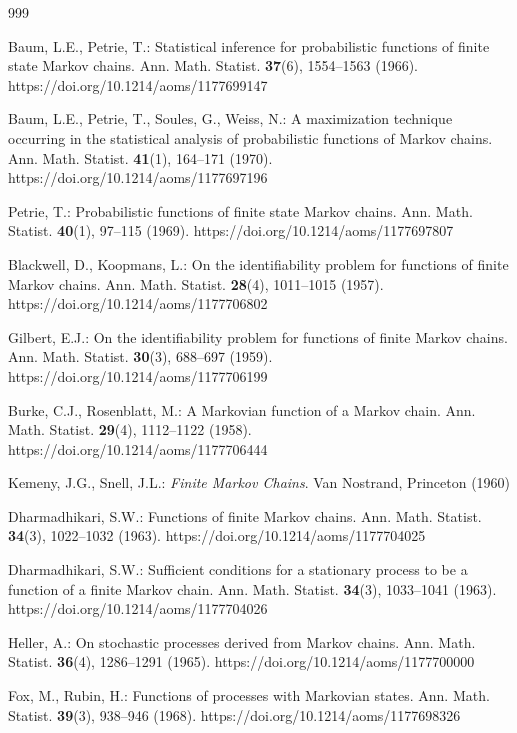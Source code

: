 
\begin{thebibliography}{999}


Baum, L.E., Petrie, T.: Statistical inference for probabilistic functions of finite state Markov chains. Ann. Math. Statist. \textbf{37}(6), 1554--1563 (1966). https://doi.org/10.1214/aoms/1177699147

Baum, L.E., Petrie, T., Soules, G., Weiss, N.: A maximization technique occurring in the statistical analysis of probabilistic functions of Markov chains. Ann. Math. Statist. \textbf{41}(1), 164--171 (1970). https://doi.org/10.1214/aoms/1177697196

Petrie, T.: Probabilistic functions of finite state Markov chains. Ann. Math. Statist. \textbf{40}(1), 97--115 (1969). https://doi.org/10.1214/aoms/1177697807

Blackwell, D., Koopmans, L.: On the identifiability problem for functions of finite Markov chains. Ann. Math. Statist. \textbf{28}(4), 1011--1015 (1957). https://doi.org/10.1214/aoms/1177706802

Gilbert, E.J.: On the identifiability problem for functions of finite Markov chains. Ann. Math. Statist. \textbf{30}(3), 688--697 (1959). https://doi.org/10.1214/aoms/1177706199

Burke, C.J., Rosenblatt, M.: A Markovian function of a Markov chain. Ann. Math. Statist. \textbf{29}(4), 1112--1122 (1958). https://doi.org/10.1214/aoms/1177706444

Kemeny, J.G., Snell, J.L.: \emph{Finite Markov Chains}. Van Nostrand, Princeton (1960)

Dharmadhikari, S.W.: Functions of finite Markov chains. Ann. Math. Statist. \textbf{34}(3), 1022--1032 (1963). https://doi.org/10.1214/aoms/1177704025

Dharmadhikari, S.W.: Sufficient conditions for a stationary process to be a function of a finite Markov chain. Ann. Math. Statist. \textbf{34}(3), 1033--1041 (1963). https://doi.org/10.1214/aoms/1177704026

Heller, A.: On stochastic processes derived from Markov chains. Ann. Math. Statist. \textbf{36}(4), 1286--1291 (1965). https://doi.org/10.1214/aoms/1177700000

Fox, M., Rubin, H.: Functions of processes with Markovian states. Ann. Math. Statist. \textbf{39}(3), 938--946 (1968). https://doi.org/10.1214/aoms/1177698326


\end{thebibliography}
